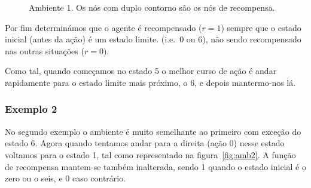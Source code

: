 \documentclass[a4paper,twocolumn]{article}
\begin{document}
    \begin{figure}[ht]
        \centering
        \caption{Ambiente 1. Os nós com duplo contorno são os nós de recompensa.} \label{fig:amb1}
    \end{figure}

    Por fim determinámos que o agente é recompensado ($r = 1$) sempre que o estado
    inicial (antes da ação) é um estado limite. (i.e.~0 ou 6), não sendo recompensado
    nas outras situações ($r = 0$).

    Como tal, quando começamos no estado 5 o melhor curso de ação é andar rapidamente
    para o estado limite mais próximo, o 6, e depois mantermo-nos lá.

    \subsubsection{Exemplo 2}
    No segundo exemplo o ambiente é muito semelhante ao primeiro com exceção do estado 6. Agora quando
    tentamos andar para a direita (ação 0) nesse estado voltamos para o estado 1, tal como representado na figura~\ref{fig:amb2}.
    A função de recompensa mantem-se também inalterada, sendo 1 quando o estado inicial é o zero ou o seis, e
    0 caso contrário.
\end{document}
